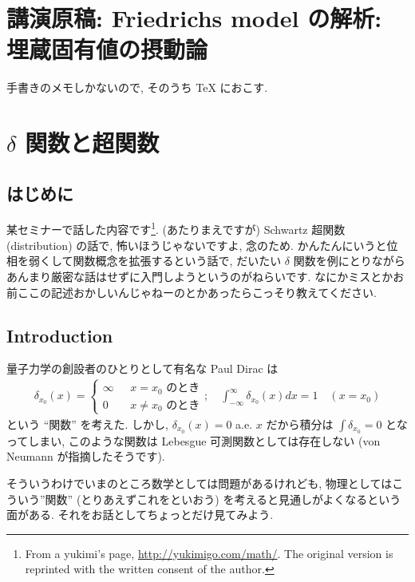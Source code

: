 \documentclass[openany, a4paper, oneside]{book}
\theoremstyle{break}
\theoremstyle{breakdefn}
\begin{document}
\chapter{講演原稿: Friedrichs model の解析: 埋蔵固有値の摂動論}
\label{sec-7-11}

手書きのメモしかないので, そのうち \TeX{} におこす.
\chapter{$\delta$ 関数と超関数}
\label{sec-7-12}
\section{はじめに}
\label{sec-7-12-1}

某セミナーで話した内容です\footnote{From a yukimi's page, \href{http://yukimigo.com/math/}{http://yukimigo.com/math/}.
The original version is reprinted with the written consent of the author.
 }.
(あたりまえですが) Schwartz 超関数 (distribution) の話で, 怖いほうじゃないですよ, 念のため.
かんたんにいうと位相を弱くして関数概念を拡張するという話で,
だいたい $\delta$ 関数を例にとりながらあんまり厳密な話はせずに入門しようというのがねらいです.
なにかミスとかお前ここの記述おかしいんじゃねーのとかあったらこっそり教えてください.
\section{Introduction}
\label{sec-7-12-2}

量子力学の創設者のひとりとして有名な Paul Dirac は
\begin{align}
 \delta_{x_0}(x)
 =
 \begin{cases}
  \infty & \text{ $x = x_0$ のとき} \\
  0 & \text{ $x \neq x_0$ のとき}
 \end{cases}; \quad
 \int_{-\infty}^{\infty} \delta_{x_0} (x) dx
 =
 1 \quad (x = x_0)
\end{align}
という ``関数'' を考えた.
しかし, $\delta_{x_0}(x) = 0$ a.e. $x$ だから積分は $\int\delta_{x_0} = 0$ となってしまい,
このような関数は Lebesgue 可測関数としては存在しない (von Neumann が指摘したそうです).

そういうわけでいまのところ数学としては問題があるけれども,
物理としてはこういう''関数'' (とりあえずこれをといおう) を考えると見通しがよくなるという面がある.
それをお話としてちょっとだけ見てみよう.
\end{document}
